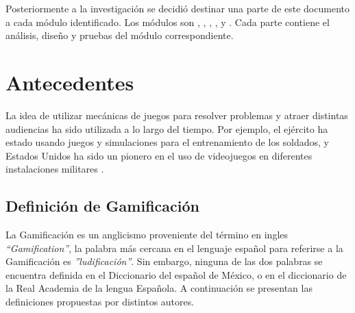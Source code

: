\noindent Posteriormente a la investigación se decidió destinar una parte de este documento a cada módulo identificado. Los módulos son , , , ,  y . Cada parte contiene el análisis, diseño y pruebas del módulo correspondiente.\\
\clearpage



\section{Antecedentes}
\label{sec:antecedentes}

La idea de utilizar mecánicas de juegos para resolver problemas y atraer distintas audiencias ha sido utilizada a lo largo del tiempo. Por ejemplo, el ejército ha estado usando juegos y simulaciones para el entrenamiento de los soldados, y Estados Unidos ha sido un pionero en el uso de videojuegos en diferentes instalaciones militares \cite{GamByDesign}.


\subsection{Definición de Gamificación}

La Gamificación es un anglicismo proveniente del término en ingles {\it``Gamification''}, la palabra más cercana en el lenguaje español para referirse a la Gamificación es {\it''ludificación''}. Sin embargo, ninguna de las dos palabras se encuentra definida en el Diccionario del español de México, o en el diccionario de la Real Academia de la lengua Española. A continuación se presentan las definiciones propuestas por distintos autores.

